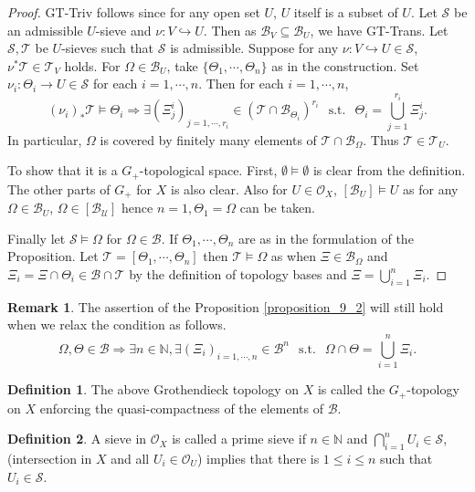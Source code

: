 \documentclass[10pt]{article}
\numberwithin{equation}{section}
\theoremstyle{definition}
\newtheorem{definition}{Definition}[subsection]
\newtheorem{remark}{Remark}[subsection]
\DeclareMathOperator{\straw}{s.t.}
\newcommand{\Ouv}{\mathscr{O}}
\newcommand{\N}[0]{\mathbb{N}}
\newcommand{\U}[0]{\mathcal{U}}
\newcommand{\st}[0]{\:\straw\:}
\newcommand{\sS}[0]{\mathscr{S}}
\newcommand{\sT}[0]{\mathscr{T}}
\newcommand{\cB}[0]{\mathcal{B}}
\begin{document}
\begin{proof}
    GT-Triv follows since for any open set $U$, $U$ itself is a subset of $U$. Let $\sS$ be an admissible $U$-sieve and $\nu:V\hookrightarrow U$. Then as $\mathcal{B}_V\subseteq\mathcal{B}_U$, we have GT-Trans. Let $\mathscr{S},\mathscr{T}$ be $U$-sieves such that $\sS$ is admissible. Suppose for any $\nu:V\hookrightarrow U\in\mathscr{S}$, $\nu^*\mathscr{T}\in\mathcal{T}_V$ holds.
    For $\Omega\in\cB_U$, take $\{\Theta_1,\cdots,\Theta_n\}$ as in the construction. Set $\nu_i:\Theta_i\to U\in\sS$ for each $i=1,\cdots,n$. Then for each $i=1,\cdots,n$,
    \begin{equation*}
    (\nu_i)_*\sT\vDash \Theta_i\Rightarrow \exists (\Xi^i_j)_{j=1,\cdots,r_i}\in(\sT\cap\cB_{\Theta_i})^{r_i}\:\st\: \Theta_i = \bigcup_{j=1}^{r_i}\Xi_j^i.
    \end{equation*}
    In particular, $\Omega$ is covered by finitely many elements of $\sT\cap\cB_\Omega$. Thus $\mathscr{T}\in\mathcal{T}_U$.
    \par To show that it is a $G_+$-topological space. First, $\emptyset\vDash \emptyset$ is clear from the definition. The other parts of $G_+$ for $X$ is also clear. Also for $U\in\Ouv_X$, $[\cB_U]\vDash U$ as for any $\Omega\in\cB_U$, $\Omega\in[\cB_\U]$ hence $n=1,\Theta_1=\Omega$ can be taken.
    \par Finally let $\sS\vDash \Omega$ for $\Omega\in\mathcal{B}$. If $\Theta_1,\cdots,\Theta_n$ are as in the formulation of the Proposition. Let $\mathscr{T} = [\Theta_1,\cdots,\Theta_n]$ then $\mathscr{T}\vDash \Omega$ as when $\Xi\in\cB_\Omega$ and $\Xi_i = \Xi\cap \Theta_i\in\cB\cap \mathscr{T}$ by the definition of topology bases and $\Xi=\bigcup_{i=1}^n\Xi_i$.
\end{proof}
\begin{remark}
    The assertion of the Proposition \ref{proposition_9_2} will still hold when we relax the condition as follows.
    \begin{equation*}
        \Omega,\Theta\in\cB\Rightarrow \exists n\in\N, \exists (\Xi_i)_{i=1,\cdots,n}\in\cB^n\:\st \: \Omega\cap\Theta = \bigcup_{i=1}^n \Xi_i.
    \end{equation*}
\end{remark}
\begin{definition}
    \label{definition_9_7}
    The above Grothendieck topology on $X$ is called the $G_+$-topology on $X$ enforcing the quasi-compactness of the elements of $\cB$.
\end{definition}
\begin{definition}
    \label{definition_9_8}
    A sieve in $\Ouv_X$ is called a prime sieve if $n\in\N$ and $\bigcap_{i=1}^nU_i\in\sS$, (intersection in $X$ and all $U_i\in\Ouv_U$) implies that there is $1\leq i\leq n$ such that $U_i\in\sS$.
\end{definition}
\end{document}
